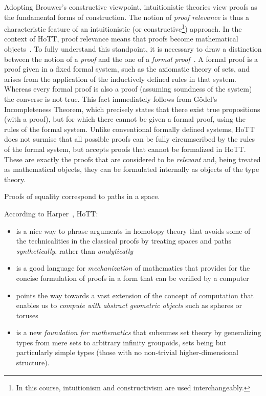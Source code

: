 \documentclass[12pt]{article}
\begin{document}
Adopting Brouwer's constructive viewpoint, intuitionistic theories view proofs as the
fundamental forms of construction.  The notion of \emph{proof relevance} is thus a
characteristic feature of an intuitionistic (or constructive\footnote{In this course,
  intuitionism and constructivism are used interchangeably.}) approach.  In the context of
\ac{HoTT}, proof relevance means that proofs become mathematical objects~\cite{Harper2013}.
To fully understand this standpoint, it is necessary to draw a distinction between the notion
of a \emph{proof} and the one of a \emph{formal proof}~\cite{Harper2013,Harper2012}.  A formal
proof is a proof given in a fixed formal system, such as the axiomatic theory of sets, and
arises from the application of the inductively defined rules in that system.  Whereas every
formal proof is also a proof (assuming soundness of the system) the converse is not true.  This
fact immediately follows from G\"{o}del's Incompleteness Theorem, which precisely states that
there exist true propositions (with a proof), but for which there cannot be given a formal
proof, using the rules of the formal system.  Unlike conventional formally defined systems,
\ac{HoTT} does not surmise that all possible proofs can be fully circumscribed by the rules of
the formal system, but accepts proofs that cannot be formalized in \ac{HoTT}.  These are
exactly the proofs that are considered to be \emph{relevant} and, being treated as mathematical
objects, they can be formulated internally as objects of the type theory.

Proofs of equality correspond to paths in a space.

According to Harper~\cite{Harper2013a,Harper2013}, \ac{HoTT}:

\begin{itemize}

\item is a nice way to phrase arguments in homotopy theory that avoids some of the technicalities
  in the classical proofs by treating spaces and paths \emph{synthetically}, rather than
  \emph{analytically}

\item is a good language for \emph{mechanization} of mathematics that provides for the concise
  formulation of proofs in a form that can be verified by a computer

\item points the way towards a vast extension of the concept of computation that enables us to
  \emph{compute with abstract geometric objects} such as spheres or toruses

\item is a new \emph{foundation for mathematics} that subsumes set theory by generalizing
  types from mere sets to arbitrary infinity groupoids, sets being but particularly simple
  types (those with no non-trivial higher-dimensional structure).

\end{itemize}
\end{document}
